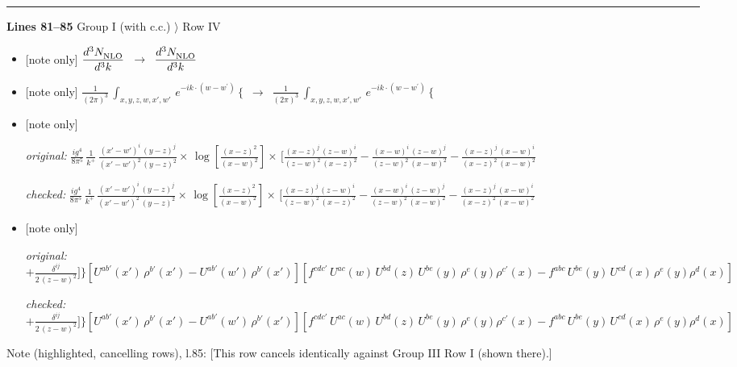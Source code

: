 \documentclass[10pt]{article}
\newenvironment{notebox}{\def\FrameCommand{{\color{notebar}\vrule width 1.5pt}\hspace{6pt}}\MakeFramed{\advance\hsize-\width\FrameRestore}\small}{\endMakeFramed}
\begin{document}
\noindent\rule{\linewidth}{0.3pt}\par\noindent\textbf{Lines 81--85} \quad \textsf{Group I (with c.c.) $\rangle$ Row IV} \par
\begin{itemize}[leftmargin=2.2em,itemsep=1pt,topsep=2pt]
\item[\textbf{l.81}] \textsf{\small [note only]} $\displaystyle \frac{d^{3}N_{\rm NLO}^{\rm}}{d^{3}k}$\ $\longrightarrow$\ $\displaystyle \frac{d^{3}N_{\rm NLO}^{\rm}}{d^{3}k}$
\item[\textbf{l.81}] \textsf{\small [note only]} $\displaystyle \frac{1}{(2\pi)^{3}}\, \int_{x,y,z,w,x',w'}\,e^{-ik\cdot (w-w^\prime)}\,\Bigg\{$\ $\longrightarrow$\ $\displaystyle \frac{1}{(2\pi)^{3}}\, \int_{x,y,z,w,x',w'}\,e^{-ik\cdot (w-w^\prime)}\,\Bigg\{$
\item[\textbf{l.83}] \textsf{\small [note only]} \par\noindent\emph{original:} $\displaystyle \frac{ig^{4}}{8\pi^{5}}\,\frac{1}{k^{+}}\,\frac{(x'-w')^{i}\,(y-z)^{j}}{(x'-w')^{2}\,(y-z)^{2}}\times\,\log{[\frac{(x-z)^{2}}{(x-w)^{2}}]}\times\, \bigg[\frac{(x-z)^{j}\,(z-w)^{i}}{(z-w)^{2}\,(x-z)^{2}} -\frac{(x-w)^{i}\,(z-w)^{j}}{(z-w)^{2}\,(x-w)^{2}}-\frac{(x-z)^{j}\,(x-w)^{i}}{(x-z)^{2}\,(x-w)^{2}}$\par\noindent\emph{checked:} $\displaystyle \frac{ig^{4}}{8\pi^{5}}\,\frac{1}{k^{+}}\,\frac{(x'-w')^{i}\,(y-z)^{j}}{(x'-w')^{2}\,(y-z)^{2}}\times\,\log{[\frac{(x-z)^{2}}{(x-w)^{2}}]}\times\, \bigg[\frac{(x-z)^{j}\,(z-w)^{i}}{(z-w)^{2}\,(x-z)^{2}} -\frac{(x-w)^{i}\,(z-w)^{j}}{(z-w)^{2}\,(x-w)^{2}}-\frac{(x-z)^{j}\,(x-w)^{i}}{(x-z)^{2}\,(x-w)^{2}}$
\item[\textbf{l.83}] \textsf{\small [note only]} \par\noindent\emph{original:} $\displaystyle +\frac{\delta^{ij}}{2\,(z-w)^{2}}\bigg]\Bigg\} [U^{ab'}(x')\,\rho^{b'}(x')-U^{ab'}(w')\,\rho^{b'}(x')] [f^{cdc'}\,U^{ac}(w)\,U^{bd}(z)\,U^{be}(y)\,\rho^{e}(y)\rho^{c'}(x)-f^{abc}\,U^{be}(y)\,U^{cd}(x)\,\rho^{e}(y)\rho^{d}(x)]$\par\noindent\emph{checked:} $\displaystyle +\frac{\delta^{ij}}{2\,(z-w)^{2}}\bigg]\Bigg\} [U^{ab'}(x')\,\rho^{b'}(x')-U^{ab'}(w')\,\rho^{b'}(x')] [f^{cdc'}\,U^{ac}(w)\,U^{bd}(z)\,U^{be}(y)\,\rho^{e}(y)\rho^{c'}(x)-f^{abc}\,U^{be}(y)\,U^{cd}(x)\,\rho^{e}(y)\rho^{d}(x)]$
\end{itemize}
\begin{notebox}\textsf{\small Note (highlighted, cancelling rows), l.85:} [This row cancels identically against Group III Row I (shown there).]\end{notebox}
\end{document}
